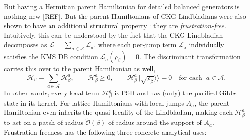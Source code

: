 But having a Hermitian parent Hamiltonian for detailed balanced generators is nothing new [REF]. But the parent Hamiltonians of CKG Lindbladians were also shown to have an additional structural property \cite[Proposition I.1]{chen2023efficient}: they are \emph{frustration-free}. Intuitively, this can be understood by the fact that the CKG Lindbladian decomposes as $\mathcal{L} = \sum_{a\in\mathcal{A}} \mathcal{L}_a$, where each per-jump term $\mathcal{L}_a$ individually satisfies the KMS DB condition $\mathcal{L}_a(\rho_\beta) = 0$. The discriminant transformation carries this over to the parent Hamiltonian as well,
\begin{equation}
    \mathcal{H}_\beta = \sum_{a\in\mathcal{A}} \mathcal{H}_\beta^a, \qquad \mathcal{H}_\beta^a \geq 0, \qquad \mathcal{H}_\beta^a\,|\sqrt{\rho_\beta}\rangle\!\rangle = 0 \quad\text{for each}\;\; a\in\mathcal{A}.
\end{equation}
In other words, every local term $\mathcal{H}_\beta^a$ is PSD and has (only) the purified Gibbs state in its kernel. For lattice Hamiltonians with local jumps $A_a$, the parent Hamiltonian even inherits the quasi-locality of the Lindbladian, making each $\mathcal{H}_\beta^a$ to act on a patch of radius $\tilde{\mathcal{O}}(\beta)$ of radius around the support of $A_a$. Frustration-freeness has the following three concrete analytical uses:
